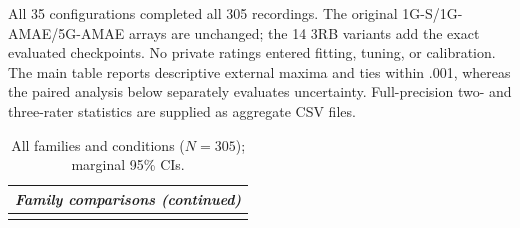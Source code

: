 \documentclass[10pt]{article}
\begin{document}
All 35 configurations completed all 305 recordings. The original 1G-S/1G-AMAE/5G-AMAE arrays are unchanged; the 14 3RB variants add the exact evaluated checkpoints. No private ratings entered fitting, tuning, or calibration. The main table reports descriptive external maxima and ties within .001, whereas the paired analysis below separately evaluates uncertainty. Full-precision two- and three-rater statistics are supplied as aggregate CSV files.
\clearpage
\begin{landscape}
\begingroup\fontsize{6.5}{7}\selectfont\setlength{\tabcolsep}{2.5pt}\setlength{\LTcapwidth}{\linewidth}\renewcommand{\arraystretch}{0.95}
\begin{longtable}{@{}l*{10}{c}@{}}
\caption{All families and conditions ($N=305$); marginal 95\% CIs.}\label{tab:all-constructs}\\
\endfirsthead
\multicolumn{11}{l}{\textit{Family comparisons (continued)}}\\\endhead
\bottomrule\endfoot


\end{longtable}
\end{landscape}
\end{document}
